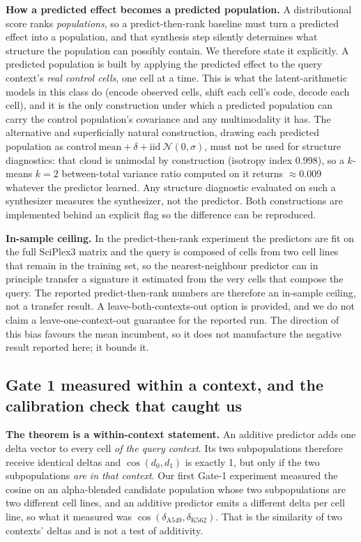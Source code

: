 \documentclass[11pt,letterpaper]{article}
\begin{document}
\textbf{How a predicted effect becomes a predicted population.} A distributional score
ranks \emph{populations}, so a predict-then-rank baseline must turn a predicted effect into
a population, and that synthesis step silently determines what structure the population can
possibly contain. We therefore state it explicitly. A predicted population is built by applying
the predicted effect to the query context's \emph{real control cells}, one cell at a time.
This is what the latent-arithmetic models in this class do (encode observed cells, shift
each cell's code, decode each cell), and it is the only construction under which a
predicted population can carry the control population's covariance and any multimodality it
has. The alternative and superficially natural construction, drawing each predicted
population as $\mathrm{control\ mean} + \delta + \mathrm{iid}\ \mathcal{N}(0,\sigma)$, must
not be used for structure diagnostics: that cloud is unimodal by construction (isotropy
index 0.998), so a $k$-means $k{=}2$ between-total variance ratio computed on it returns
$\approx$0.009 whatever the predictor learned. Any structure diagnostic evaluated on such a
synthesizer measures the synthesizer, not the predictor. Both constructions are implemented
behind an explicit flag so the difference can be reproduced.

\textbf{In-sample ceiling.} In the predict-then-rank experiment the predictors are fit on
the full SciPlex3 matrix and the query is composed of cells from two cell lines that remain
in the training set, so the nearest-neighbour predictor can in principle transfer a
signature it estimated from the very cells that compose the query. The reported
predict-then-rank numbers are therefore an in-sample ceiling, not a transfer
result. A leave-both-contexts-out option is provided, and we do not claim a leave-one-context-out guarantee for the reported run. The
direction of this bias favours the mean incumbent, so it does not manufacture the negative
result reported here; it bounds it.

\subsection*{Gate 1 measured within a context, and the calibration check that caught us}

\textbf{The theorem is a within-context statement.} An additive predictor adds one delta vector to
every cell \emph{of the query context}. Its two subpopulations therefore receive identical deltas
and $\cos(d_0,d_1)$ is exactly 1, but only if the two subpopulations \emph{are in that context}.
Our first Gate-1 experiment measured the cosine on an alpha-blended candidate population whose two
subpopulations are two different cell lines, and an additive predictor emits a different delta per
cell line, so what it measured was $\cos(\delta_{\mathrm{A549}}, \delta_{\mathrm{K562}})$. That is
the similarity of two contexts' deltas and is not a test of additivity.
\end{document}
